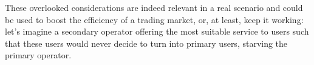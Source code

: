 These overlooked considerations are indeed relevant in a real scenario and could be used to boost the efficiency of a trading market, or, at least, keep it working: let's imagine a secondary operator offering the most suitable service to users such that these users would never decide to turn into primary users, starving the primary operator. 




